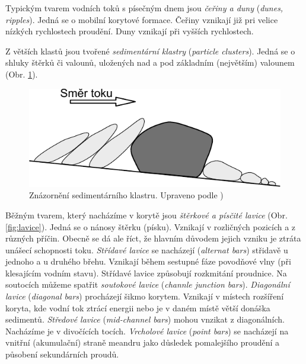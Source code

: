 Typickým tvarem vodních toků s písečným dnem jsou \emph{čeřiny a duny} (\textit{dunes, ripples}). Jedná se o mobilní korytové formace. Čeřiny vznikají již pri velice nízkých rychlostech proudění. Duny vznikají při vyšších rychlostech. 

Z větších klastů jsou tvořené \emph{sedimentární klastry} (\textit{particle clusters}). Jedná se o shluky štěrků či valounů, uložených nad a pod základním (největším) valounem (Obr. \ref{fig:klastklastr}). 

\begin{figure}
	\centering
	\includegraphics[width=1\linewidth]{obrazky/fluvial/klast_klastr}
	\caption{Znázornění sedimentárního klastru. Upraveno podle \textcite{galiaFluvialniGeomorfologie2017})}
	\label{fig:klastklastr}
\end{figure}

Běžným tvarem, který nacházíme v korytě jsou \emph{štěrkové a písčité lavice} (Obr. \ref{fig:lavice}). Jedná se o nánosy štěrku (písku). Vznikají v rozličných pozicích a z různých příčin. Obecně se dá ale říct, že hlavním důvodem jejich vzniku je ztráta unášecí schopnosti toku. \emph{Střídavé lavice} se nacházejí (\textit{alternat bars}) střidavě u jednoho a u druhého břehu. Vznikají během sestupné fáze povodňové vlny (při klesajícím vodním stavu). Střídavé lavice způsobují rozkmitání proudnice. Na soutocích můžeme spatřit \emph{soutokové lavice} (\textit{channle junction bars}). \emph{Diagonální lavice} (\textit{diagonal bars}) procházejí šikmo korytem. Vznikají v místech rozšíření koryta, kde vodní tok ztrácí energii nebo je v daném místě větší donáška sedimentů. \emph{Středové lavice} (\textit{mid-channel bars}) mohou vnzikat z diagonálních. Nacházíme je v divočících tocích. \emph{Vrcholové lavice} (\textit{point bars}) se nacházejí na vnitřní (akumulační) straně meandru jako důsledek pomalejšího proudění a působení sekundárních proudů.

